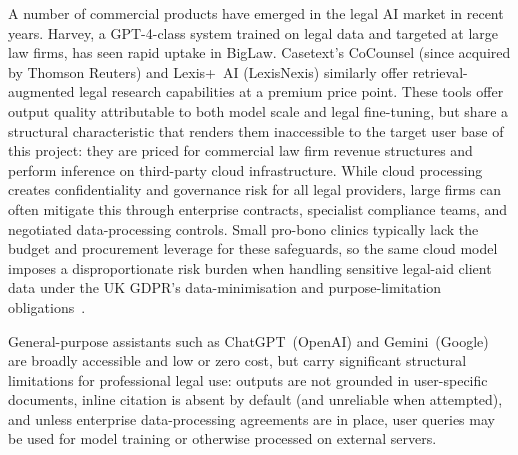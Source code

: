 \documentclass[11pt,a4paper]{article}
\begin{document}
A number of commercial products have emerged in the legal AI market in recent years. Harvey,
a GPT-4-class system trained on legal data and targeted at large law firms, has seen rapid
uptake in BigLaw. Casetext's
CoCounsel (since acquired by Thomson Reuters) and Lexis+~AI (LexisNexis) similarly offer
retrieval-augmented legal research capabilities at a premium price point.
These tools offer output quality attributable to both model scale and legal fine-tuning, but
share a structural characteristic that renders them inaccessible to the target user base of
this project: they are priced for commercial law firm revenue structures and perform inference
on third-party cloud infrastructure. While cloud processing creates confidentiality and governance
risk for all legal providers, large firms can often mitigate this through enterprise contracts,
specialist compliance teams, and negotiated data-processing controls. Small pro-bono clinics
typically lack the budget and procurement leverage for these safeguards, so the same cloud model
imposes a disproportionate risk burden when handling sensitive legal-aid client data under the
UK GDPR's data-minimisation and purpose-limitation
obligations~\cite{ukgdpr_art5_2018,ico_purpose_limitation_2024,ico_data_minimisation_2024}.

General-purpose assistants such as ChatGPT~(OpenAI) and Gemini~(Google) are broadly accessible
and low or zero cost, but carry significant structural limitations for professional legal use:
outputs are not grounded in user-specific documents, inline citation is absent by default (and
unreliable when attempted), and unless enterprise data-processing agreements are in place,
user queries may be used for model training or otherwise processed on external servers.

\begin{table}[h]
\centering
{}
\caption{Comparison of current legal assistance technologies.}
\label{tab:comparison}
\end{table}
\end{document}
